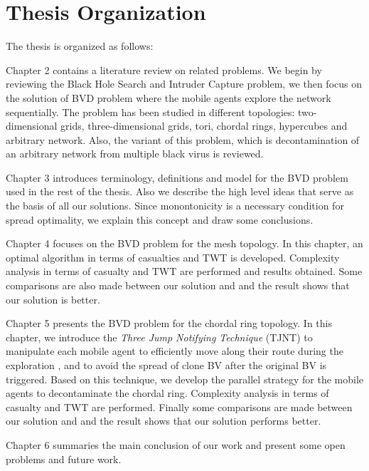 
\section{Thesis Organization} 

The thesis is organized as follows:

Chapter 2 contains a literature review on related problems. We begin by reviewing the Black Hole Search and Intruder Capture problem, we then focus on the solution of BVD problem where the mobile agents explore the network sequentially. The problem has been studied in different topologies: two-dimensional grids, three-dimensional grids, tori, chordal rings, hypercubes and arbitrary network. Also, the variant of this problem, which is decontamination of an arbitrary network from multiple black virus is   reviewed. 

Chapter 3 introduces terminology, definitions and model for the BVD problem used in the rest of the thesis. Also we describe the high level ideas that serve as the basis of all our solutions. Since monontonicity is a necessary condition for spread optimality, we explain this concept  and draw some  conclusions.

Chapter 4 focuses on the BVD problem for the mesh topology. In this chapter, an optimal algorithm in terms of casualties and TWT is developed. Complexity analysis in terms of casualty and TWT are performed and results obtained. Some comparisons  are also made between our solution and \cite{Cai} and the result shows that our solution is better.

Chapter 5 presents the BVD problem for the chordal ring topology. In this chapter, we introduce the {\em Three Jump Notifying Technique} (TJNT) to manipulate each mobile agent to efficiently move along their route during the exploration ,   and to avoid  the spread of clone BV after the original BV is triggered. Based on this technique, we develop the parallel strategy for the mobile agents to decontaminate the chordal ring. Complexity analysis in terms of casualty and TWT are performed. Finally some comparisons are made between our solution and \cite{Alotaibi} and the result shows that our solution performs better.

Chapter 6 summaries the main conclusion of our work and present some open problems and future work.
  



